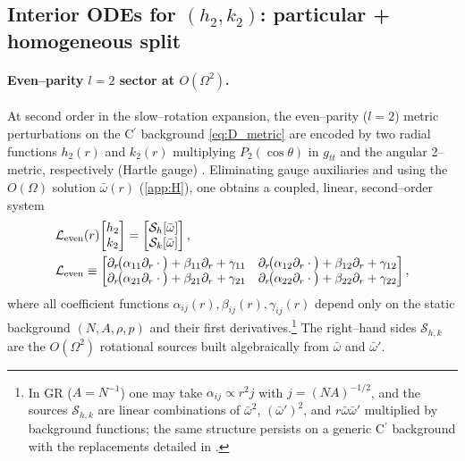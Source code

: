 \documentclass{iopjournal}
\begin{document}
\subsection{\texorpdfstring{Interior ODEs for $(h_2,k_2)$: particular + homogeneous split}{Interior ODEs for (h2, k2): particular + homogeneous split}}\label{app:I1}

\paragraph{Even–parity $l=2$ sector at $O(\Omega^2)$.}
At second order in the slow–rotation expansion, the even–parity ($l=2$) metric perturbations on the C$^\prime$ background \eqref{eq:D_metric} are encoded by two radial functions $h_2(r)$ and $k_2(r)$ multiplying $P_2(\cos\theta)$ in $g_{tt}$ and the angular 2–metric, respectively (Hartle gauge) \cite{Hartle1967,HartleThorne1968,PoissonWill2014}. Eliminating gauge auxiliaries and using the $O(\Omega)$ solution $\bar\omega(r)$ (\cref{app:H}), one obtains a coupled, linear, second–order system
\begin{equation}
\begin{aligned}
&\mathcal L_{\rm even}(r)\!\begin{bmatrix}h_2\\ k_2\end{bmatrix}
=\begin{bmatrix}\mathcal S_h[\bar\omega]\\ \mathcal S_k[\bar\omega]\end{bmatrix},\\
&\mathcal L_{\rm even}\equiv
\begin{bmatrix}
\partial_r\!\big(\alpha_{11}\partial_r\cdot\big)+\beta_{11}\partial_r+\gamma_{11} &
\partial_r\!\big(\alpha_{12}\partial_r\cdot\big)+\beta_{12}\partial_r+\gamma_{12} \\
\partial_r\!\big(\alpha_{21}\partial_r\cdot\big)+\beta_{21}\partial_r+\gamma_{21} &
\partial_r\!\big(\alpha_{22}\partial_r\cdot\big)+\beta_{22}\partial_r+\gamma_{22}
\end{bmatrix},
\end{aligned}
\label{eq:I1_system}
\end{equation}
where all coefficient functions $\alpha_{ij}(r),\beta_{ij}(r),\gamma_{ij}(r)$ depend only on the static background $(N,A,\rho,p)$ and their first derivatives.\footnote{In GR ($A=N^{-1}$) one may take $\alpha_{ij}\propto r^2 j$ with $j=(NA)^{-1/2}$, and the sources $\mathcal S_{h,k}$ are linear combinations of $\bar\omega^2$, $(\bar\omega')^2$, and $r\bar\omega\bar\omega'$ multiplied by background functions; the same structure persists on a generic C$^\prime$ background with the replacements detailed in \cite{Hartle1967,HartleThorne1968,PoissonWill2014}.} The right–hand sides $\mathcal S_{h,k}$ are the $O(\Omega^2)$ rotational sources built algebraically from $\bar\omega$ and $\bar\omega'$.
\end{document}
